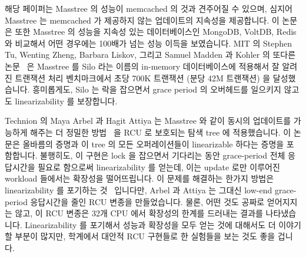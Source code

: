 해당 페이퍼는 Masstree 의 성능이 memcached 의 것과 견주어질 수 있으며, 심지어
Masstree 는 memcached 가 제공하지 않는 업데이트의 지속성을 제공합니다.
이 논문은 또한 Masstree 의 성능을 지속성 있는 데이터베이스인 MongoDB, VoltDB,
Redis 와 비교해서 어떤 경우에는 100배가 넘는 성능 이득을 보였습니다.
MIT 의 Stephen Tu, Wenting Zheng, Barbara Liskov, 그리고 Samuel Madden 과
Kohler 의 또다른 논문~\cite{Tu:2013:STM:2517349.2522713} 은 Masstree 를 Silo
라는 이름의 in-memory 데이터베이스에 적용해서 잘 알려진 트랜잭션 처리
벤치마크에서 초당 700K 트랜잭션 (분당 42M 트랜잭션) 을 달성했습니다.
흥미롭게도, Silo 는 락을 잡으면서 grace period 의 오버헤드를 일으키지 않고도
linearizability 를 보장합니다.
\iffalse

Yandong Mao and Robert Morris of MIT and Eddie Kohler of
Harvard University created another RCU-protected tree named
Masstree~\cite{Mao:2012:CCF:2168836.2168855} that combines ideas from B+
trees and tries.
Although this tree is about 2.5x slower than an RCU-protected hash table,
it supports operations on key ranges, unlike hash tables.
In addition, Masstree supports efficient storage of objects with long
shared key prefixes and, furthermore, provides persistence via logging
to mass storage.

The paper notes that Masstree's performance rivals that of memcached, even
given that Masstree is persistently storing updates and memcached is not.
The paper also compares Masstree's performance to the persistent
datastores MongoDB, VoltDB, and Redis, reporting significant performance
advantages for Masstree, in some cases exceeding two orders of magnitude.
Another paper~\cite{Tu:2013:STM:2517349.2522713}, by Stephen Tu,
Wenting Zheng, Barbara Liskov, and Samuel Madden of MIT and Kohler,
applies Masstree to an in-memory database named Silo, achieving 700K
transactions per second (42M transactions per minute) on a well-known
transaction-processing benchmark.
Interestingly enough, Silo guarantees linearizability without incurring
the overhead of grace periods while holding locks.
\fi

Technion 의 Maya Arbel 과 Hagit Attiya 는 Masstree 와 같이 동시의 업데이트를
가능하게 해주는 더 정밀한 방법~\cite{MayaArbel2014RCUtree} 을 RCU 로 보호되는
탐색 tree 에 적용했습니다.
이 논문은 올바름의 증명과 이 tree 의 모든 오퍼레이션들이 linearizable 하다는
증명을 포함합니다.
불행히도, 이 구현은 lock 을 잡으면서 기다리는 동안 grace-period 전체 응답시간을
필요로 함으로써 linearizability 를 얻는데, 이는 update 로만 이루어진 workload
들에서는 확장성을 떨어뜨립니다.
이 문제를 해결하는 한가지 방법은 linearizability 를 포기하는
것~\cite{AndreasHaas2012FIFOisnt,PaulEMcKennneyAtomicTreeN4037} 입니다만, Arbel
과 Attiya 는 그대신 low-end grace-period 응답시간을 줄인 RCU 변종을
만들었습니다.
물론, 어떤 것도 공짜로 얻어지지는 않고, 이 RCU 변종은 32개 CPU 에서 확장성의
한계를 드러내는 결과를 나타냈습니다.
Linearizability 를 포기해서 성능과 확장성을 모두 얻는 것에 대해서도 더 이야기
할 부분이 많지만, 학계에서 대안적 RCU 구현들로 한 실험들을 보는 것도 좋을
겁니다.
\iffalse

